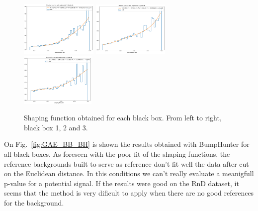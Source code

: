 \documentclass[letterpaper,11pt]{article}
\begin{document}
\begin{figure}[h!]
\centering
\includegraphics[width=0.33\textwidth]{img/shaping_func_BB1.pdf}
\includegraphics[width=0.33\textwidth]{img/shaping_func_BB2.pdf}
\includegraphics[width=0.32\textwidth]{img/shaping_func_BB3.pdf}
\caption{Shaping function obtained for each black box.  From left to right, black box 1, 2 and 3.}
\label{fig:GAE_BB_shape}
\end{figure}

\noindent On Fig.~\ref{fig:GAE_BB_BH} is shown the results obtained with BumpHunter for all black boxes.
As foreseen with the poor fit of the shaping functions, the reference backgrounds built to serve as reference don't fit well the data after cut on the Euclidean distance.
In this conditions we can't really evaluate a meanigfull p-value for a potential signal.
If the results were good on the RnD dataset, it seems that the method is very dificult to apply when there are no good references for the background.
\end{document}
